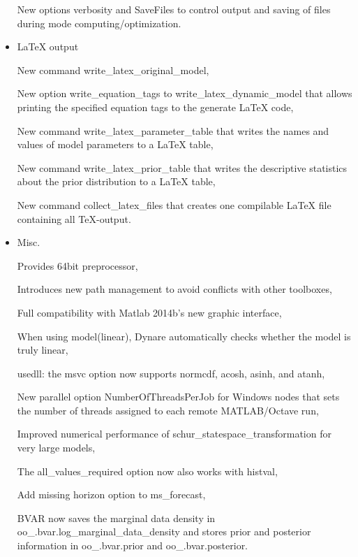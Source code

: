 \documentclass[10pt,math=newtx,citestyle=gb7714-2015,bibstyle=gb7714-2015]{elegantbook}
\begin{document}
\begin{itemize}
		
		New options verbosity and SaveFiles to control output and saving of files during mode computing/optimization.
		
		
		
		
		\item LaTeX output
		
		
		New command write\_latex\_original\_model,
		
		
		New option write\_equation\_tags to write\_latex\_dynamic\_model that allows printing the specified equation tags to the generate
		LaTeX code,
		
		
		New command write\_latex\_parameter\_table that writes the names and values of model parameters to a LaTeX table,
		
		
		New command write\_latex\_prior\_table that writes the descriptive statistics about the prior distribution to a LaTeX table,
		
		
		New command collect\_latex\_files that creates one compilable LaTeX file containing all TeX-output.
		
		
		
		
		\item Misc.
		
		
		Provides 64bit preprocessor,
		
		
		Introduces new path management to avoid conflicts with other toolboxes,
		
		
		Full compatibility with Matlab 2014b's new graphic interface,
		
		
		When using model(linear), Dynare automatically checks whether the model is truly linear,
		
		
		usedll: the msvc option now supports normcdf, acosh, asinh, and atanh,
		
		
		New parallel option NumberOfThreadsPerJob for Windows nodes that sets the number of threads assigned to each remote MATLAB/Octave run,
		
		
		Improved numerical performance of schur\_statespace\_transformation for very large models,
		
		
		The all\_values\_required option now also works with histval,
		
		
		Add missing horizon option to ms\_forecast,
		
		
		BVAR now saves the marginal data density in oo\_.bvar.log\_marginal\_data\_density and stores prior and posterior information in oo\_.bvar.prior and oo\_.bvar.posterior.
	\end{itemize}
	
	
	
\end{document}
